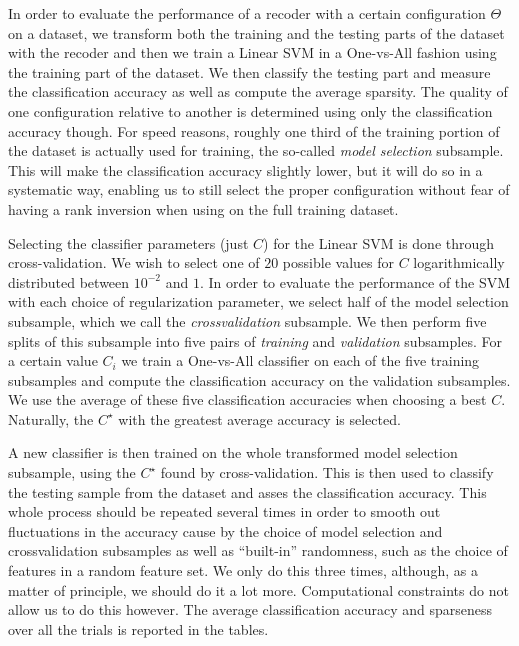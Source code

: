 \documentclass[12pt,a4paper,oneside,english]{UPBThesis}
\begin{document}
In order to evaluate the performance of a recoder with a certain configuration $\Theta$ on a dataset, we transform both the training and the testing parts of the dataset with the recoder and then we train a Linear SVM in a One-vs-All fashion using the training part of the dataset. We then classify the testing part and measure the classification accuracy as well as compute the average sparsity. The quality of one configuration relative to another is determined using only the classification accuracy though. For speed reasons, roughly one third of the training portion of the dataset is actually used for training, the so-called \emph{model selection} subsample. This will make the classification accuracy slightly lower, but it will do so in a systematic way, enabling us to still select the proper configuration without fear of having a rank inversion when using on the full training dataset.

Selecting the classifier parameters (just $C$) for the Linear SVM is done through cross-validation. We wish to select one of $20$ possible values for $C$ logarithmically distributed between $10^{-2}$ and $1$. In order to evaluate the performance of the SVM with each choice of regularization parameter, we select half of the model selection subsample, which we call the \emph{crossvalidation} subsample. We then perform five splits of this subsample into five pairs of \emph{training} and \emph{validation} subsamples. For a certain value $C_i$ we train a One-vs-All classifier on each of the five training subsamples and compute the classification accuracy on the validation subsamples. We use the average of these five classification accuracies when choosing a best $C$. Naturally, the $C^\star$ with the greatest average accuracy is selected.

A new classifier is then trained on the whole transformed model selection subsample, using the $C^\star$ found by cross-validation. This is then used to classify the testing sample from the dataset and asses the classification accuracy. This whole process should be repeated several times in order to smooth out fluctuations in the accuracy cause by the choice of model selection and crossvalidation subsamples as well as ``built-in'' randomness, such as the choice of features in a random feature set. We only do this three times, although, as a matter of principle, we should do it a lot more. Computational constraints do not allow us to do this however. The average classification accuracy and sparseness over all the trials is reported in the tables.
\end{document}
